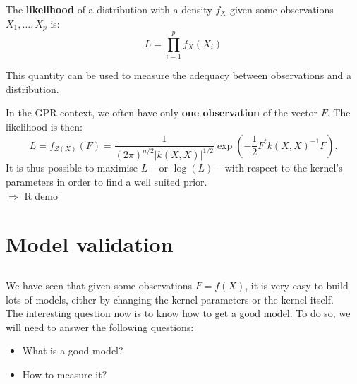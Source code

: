 \documentclass{beamer}
\begin{document}
\begin{frame}{}
\begin{definition}
The \textbf{likelihood} of a distribution with a density $f_X$ given some observations $X_1, \dots,X_p$ is:
\begin{equation*}
 	L = \prod_{i=1}^p f_X(X_i)
\end{equation*}
\end{definition}
This quantity can be used to measure the adequacy between observations and a distribution.\\ \vspace{3mm}
\end{frame}

\begin{frame}{}
In the GPR context, we often have only \textbf{one observation} of the vector $F$. The likelihood is then:
\begin{equation*}
 	L = f_{Z(X)}(F) = \frac{1}{\displaystyle (2 \pi)^{n/2} |k(X,X)|^{1/2}} \exp \left(-\frac12 F^t k(X,X)^{-1} F  \right).
\end{equation*}
It is thus possible to maximise $L$ -- or $\log(L)$ -- with respect to the kernel's parameters in order to find a well suited prior.\\
\vspace{5mm}
\alert{$\Rightarrow$ R demo}
\end{frame}

\section{Model validation}
\subsection{}

\begin{frame}{}
We have seen that given some observations $F=f(X)$, it is very easy to build lots of models, either by changing the kernel parameters or the kernel itself.\\ \vspace{5mm}
The interesting question now is to know how to get a good model. To do so, we will need to answer the following questions:
\begin{itemize}
	\item What is a good model?
	\item How to measure it?
\end{itemize}
\end{frame}
\end{document}

